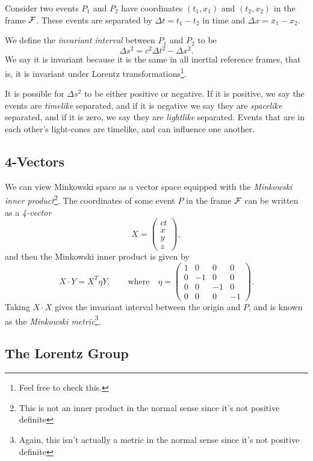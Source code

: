 \documentclass{scrartcl}
\theoremstyle{definition}
\begin{document}
Consider two events $P_1$ and $P_2$ have coordinates $(t_1, x_1)$ and $(t_2, x_2)$ in the frame $\mathcal{F}$. These events are separated by $\Delta t = t_1 - t_2$ in time and $\Delta x = x_1 - x_2$.

We define the \emph{invariant interval} between $P_1$ and $P_2$ to be
$$
\Delta s^2 = c^2 \Delta t^2 - \Delta x^2.
$$
We say it is invariant because it is the same in all inertial reference frames, that is, it is invariant under Lorentz transformations\footnote{Feel free to check this.}.

It is possible for $\Delta s^2$ to be either positive or negative. If it is positive, we say the events are \emph{timelike} separated, and if it is negative we say they are \emph{spacelike} separated, and if it is zero, we say they are \emph{lightlike} separated. Events that are in each other's light-cones are timelike, and can influence one another.

\subsection*{4-Vectors}

We can view Minkowski space as a vector space equipped with the \emph{Minkowski inner product}\footnote{This is not an inner product in the normal sense since it's not positive definite}. The coordinates of some event $P$ in the frame $\mathcal{F}$ can be written as a \emph{4-vector}
$$	
X= \begin{pmatrix}
	ct \\ x \\ y \\ z
\end{pmatrix},
$$
and then the Minkowski inner product is given by
$$
X \cdot Y = X^T \eta Y, \quad \quad \text{where} \quad \eta = \begin{pmatrix}
	1 & 0 & 0 & 0 \\
	0 & -1 & 0 & 0 \\
	0 & 0 & -1 & 0 \\
	0 & 0 & 0 & -1
\end{pmatrix}.
$$
Taking $X \cdot X$ gives the invariant interval between the origin and $P$, and is known as the \emph{Minkowski metric}\footnote{Again, this isn't actually a metric in the normal sense since it's not positive definite}.

\subsection*{The Lorentz Group}
\end{document}
